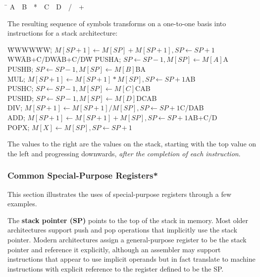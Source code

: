 \vspace{-6pt}\begin{tabbing}
\hspace{.5in}\=\kill
\>A~~B~~*~~C~~D~~/~~+
\end{tabbing}\vspace{-6pt}
%
The resulting sequence of symbols transforms on a one-to-one basis
into instructions for a stack architecture:
%
\vspace{-6pt}\begin{tabbing}
\hspace{.5in}\=WWWW\=WW\=; $M[SP+1] \leftarrow M[SP] + M[SP + 1], SP \leftarrow SP + 1$WW\=AB+C/DW\=AB+C/DW\=\kill
\>PUSH\>A\>; $SP \leftarrow SP - 1, M[SP] \leftarrow M[A]$\>A\\
\>PUSH\>B\>; $SP \leftarrow SP - 1, M[SP] \leftarrow M[B]$\>B\>A\\
\>MUL\>\>; $M[SP+1] \leftarrow M[SP+1] * M[SP], SP \leftarrow SP + 1$\>AB\\
\>PUSH\>C\>; $SP \leftarrow SP - 1, M[SP] \leftarrow M[C]$\>C\>AB\\
\>PUSH\>D\>; $SP \leftarrow SP - 1, M[SP] \leftarrow M[D]$\>D\>C\>AB\\
\>DIV\>\>; $M[SP+1] \leftarrow M[SP+1] / M[SP], SP \leftarrow SP + 1$\>C/D\>AB\\
\>ADD\>\>; $M[SP+1] \leftarrow M[SP+1] + M[SP], SP \leftarrow SP + 1$\>AB+C/D\\
\>POP\>X\>; $M[X] \leftarrow M[SP], SP \leftarrow SP + 1$
\end{tabbing}\vspace{-6pt}
%
The values to the right are the values on the stack, starting with the
top value on the left and progressing downwards, {\em after the
completion of each instruction}.\\


\vfill
\pagebreak

\subsubsection{Common Special-Purpose Registers*}

This section illustrates the uses of special-purpose registers through
a few examples. 

The {\bf stack pointer (SP)} points to the top of the stack in memory.
Most older architectures support push and pop operations that
implicitly use the stack pointer.  Modern architectures assign a
general-purpose register to be the stack pointer and reference it
explicitly, although an assembler may support
instructions that appear to use implicit operands but in fact
translate to machine instructions with explicit reference to the
register defined to be the SP.


